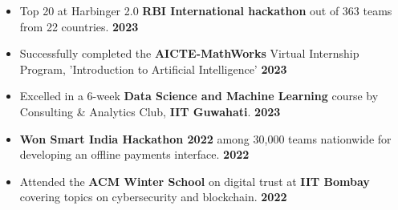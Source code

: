 \documentclass[a4,10pt]{article}
\newenvironment{zitemize}{
\begin{itemize}\itemsep0pt \parskip0pt \parsep1pt}
{\end{itemize}\vspace{-0.5cm}}
\begin{document}
\begin{zitemize}
    \item Top 20 at Harbinger 2.0 \textbf{ RBI International hackathon } out of 363 teams from 22 countries. \hfill \textbf{2023}
    \item Successfully completed the \textbf{AICTE-MathWorks} Virtual Internship Program, 'Introduction to Artificial Intelligence' \hfill \textbf{2023}
    \item Excelled in a 6-week \textbf{Data Science and Machine Learning} course by Consulting \& Analytics Club, \textbf{IIT Guwahati}. \hfill \textbf{2023}
    \item \textbf{Won Smart India Hackathon 2022} among 30,000 teams nationwide for developing an offline payments interface. \hfill \textbf{2022}
    \item Attended the \textbf{ACM Winter School} on digital trust at \textbf{IIT Bombay} covering topics on cybersecurity and blockchain. \hfill \textbf{2022}
\end{zitemize}
\vspace{-0.1cm}
\end{document}
